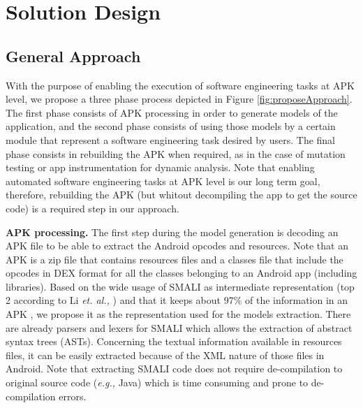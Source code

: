 
\chapter{Solution Design} %

\label{Chapter4} %

\section{General Approach} \label{sec:generalApproach}

With the purpose of enabling the execution of software engineering tasks at APK level, we propose a three phase process depicted in Figure \ref{fig:proposeApproach}. The first phase consists of APK processing in order to generate models of the application, and the second phase consists of using those models by a certain module that represent a software engineering task desired by users. The final phase consists in rebuilding the APK when required, as in the case of mutation testing or app instrumentation for dynamic analysis. Note that enabling automated software engineering tasks at APK level is our long term goal, therefore, rebuilding the APK (but whitout decompiling the app to get the source code) is a required step in our approach.

\textbf{APK processing.} The first step during the model generation is  decoding an APK file to be able to extract the Android opcodes and resources. Note that an APK is a zip file that contains resources files and a classes file that include the opcodes in DEX format for all the classes belonging to an Android app (including libraries). Based on the wide usage of SMALI as intermediate representation (top 2 according to Li \textit{et. al.,} \cite{li:IST2017}) and that it keeps about 97\% of the information in an APK  \cite{arnatovich2014empirical,arnatovich2018comparison}, we propose it as the representation used for the models extraction. There are already parsers and lexers for SMALI which allows the extraction of abstract syntax trees (ASTs). Concerning the textual information available in resources files, it can be easily extracted because of the XML nature of those files in Android. Note that extracting SMALI code does not require de-compilation to original source code (\textit{e.g.,} Java) which is time consuming and prone to de-compilation errors.

